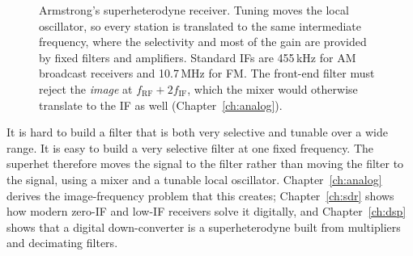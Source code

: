 \begin{figure}[htbp]\centering
{}
\caption{Armstrong's superheterodyne receiver. Tuning moves the local oscillator, so every station is
translated to the same intermediate frequency, where the selectivity and most of the gain are provided
by fixed filters and amplifiers. Standard IFs are 455\,kHz for AM broadcast receivers and 10.7\,MHz for FM.
The front-end filter must reject the \emph{image} at $f_{\mathrm{RF}}+2f_{\mathrm{IF}}$, which the mixer
would otherwise translate to the IF as well (Chapter~\ref{ch:analog}).}
\label{fig:ch01_superhet}
\end{figure}

\begin{keyidea}
It is hard to build a filter that is both very selective and tunable over a wide range. It is easy to
build a very selective filter at one fixed frequency. The superhet therefore moves the signal to the
filter rather than moving the filter to the signal, using a mixer and a tunable local oscillator.
Chapter~\ref{ch:analog} derives the image-frequency problem that this creates; Chapter~\ref{ch:sdr}
shows how modern zero-IF and low-IF receivers solve it digitally, and Chapter~\ref{ch:dsp} shows that
a digital down-converter is a superheterodyne built from multipliers and decimating filters.
\end{keyidea}

